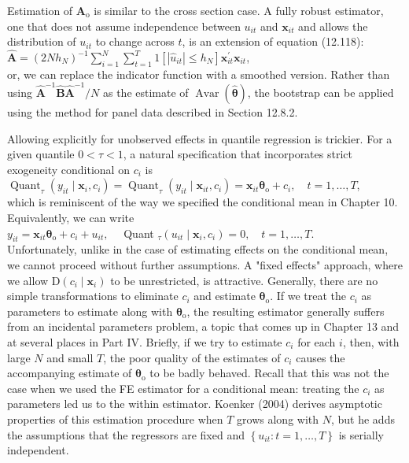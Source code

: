 \documentclass[10pt]{article}
\begin{document}
Estimation of $\mathbf{A}_{\mathrm{o}}$ is similar to the cross section case. A fully robust estimator, one that does not assume independence between $u_{i t}$ and $\mathbf{x}_{i t}$ and allows the distribution of $u_{i t}$ to change across $t$, is an extension of equation (12.118):\\
$\hat{\mathbf{A}}=\left(2 N h_{N}\right)^{-1} \sum_{i=1}^{N} \sum_{t=1}^{T} 1\left[\left|\hat{u}_{i t}\right| \leq h_{N}\right] \mathbf{x}_{i t}^{\prime} \mathbf{x}_{i t}$,\\
or, we can replace the indicator function with a smoothed version. Rather than using $\hat{\mathbf{A}}^{-1} \hat{\mathbf{B}} \hat{\mathbf{A}}^{-1} / N$ as the estimate of $\operatorname{Avar}(\hat{\boldsymbol{\theta}})$, the bootstrap can be applied using the method for panel data described in Section 12.8.2.

Allowing explicitly for unobserved effects in quantile regression is trickier. For a given quantile $0<\tau<1$, a natural specification that incorporates strict exogeneity conditional on $c_{i}$ is\\
$\operatorname{Quant}_{\tau}\left(y_{i t} \mid \mathbf{x}_{i}, c_{i}\right)=\operatorname{Quant}_{\tau}\left(y_{i t} \mid \mathbf{x}_{i t}, c_{i}\right)=\mathbf{x}_{i t} \boldsymbol{\theta}_{\mathrm{o}}+c_{i}, \quad t=1, \ldots, T$,\\
which is reminiscent of the way we specified the conditional mean in Chapter 10. Equivalently, we can write\\
$y_{i t}=\mathbf{x}_{i t} \boldsymbol{\theta}_{\mathrm{o}}+c_{i}+u_{i t}, \quad$ Quant $_{\tau}\left(u_{i t} \mid \mathbf{x}_{i}, c_{i}\right)=0, \quad t=1, \ldots, T$.\\
Unfortunately, unlike in the case of estimating effects on the conditional mean, we cannot proceed without further assumptions. A "fixed effects" approach, where we allow $\mathrm{D}\left(c_{i} \mid \mathbf{x}_{i}\right)$ to be unrestricted, is attractive. Generally, there are no simple transformations to eliminate $c_{i}$ and estimate $\boldsymbol{\theta}_{\mathrm{o}}$. If we treat the $c_{i}$ as parameters to estimate along with $\boldsymbol{\theta}_{\mathrm{o}}$, the resulting estimator generally suffers from an incidental parameters problem, a topic that comes up in Chapter 13 and at several places in Part IV. Briefly, if we try to estimate $c_{i}$ for each $i$, then, with large $N$ and small $T$, the poor quality of the estimates of $c_{i}$ causes the accompanying estimate of $\boldsymbol{\theta}_{\mathrm{o}}$ to be badly behaved. Recall that this was not the case when we used the FE estimator for a conditional mean: treating the $c_{i}$ as parameters led us to the within estimator. Koenker (2004) derives asymptotic properties of this estimation procedure when $T$ grows along with $N$, but he adds the assumptions that the regressors are fixed and $\left\{u_{i t}: t=1, \ldots, T\right\}$ is serially independent.
\end{document}
